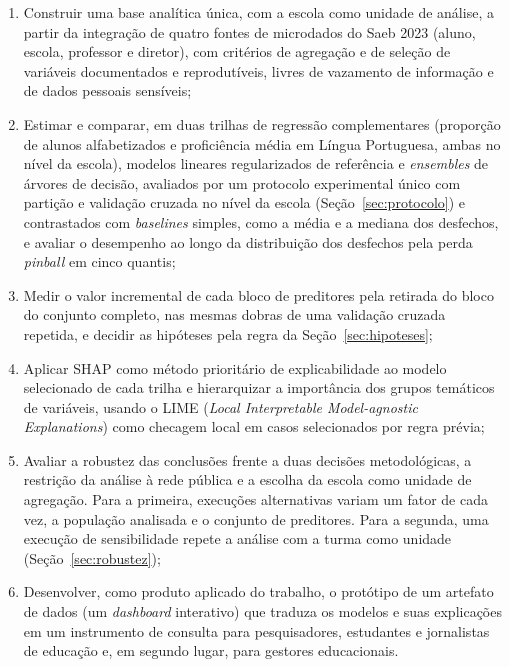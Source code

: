 \begin{enumerate}
    \item Construir uma base analítica única, com a escola como unidade de
    análise, a partir da integração de quatro fontes de microdados do Saeb
    2023 (aluno, escola, professor e diretor), com critérios de agregação e
    de seleção de variáveis documentados e reprodutíveis, livres de
    vazamento de informação e de dados pessoais sensíveis;
    \item Estimar e comparar, em duas trilhas de regressão complementares
    (proporção de alunos alfabetizados e proficiência média em Língua
    Portuguesa, ambas no nível da escola), modelos lineares regularizados
    de referência e \textit{ensembles} de árvores de decisão, avaliados por
    um protocolo experimental único com partição e validação cruzada no
    nível da escola (Seção~\ref{sec:protocolo}) e contrastados com
    \textit{baselines} simples, como a média e a mediana dos desfechos, e
    avaliar o desempenho ao longo da distribuição dos desfechos pela perda
    \textit{pinball} em cinco quantis;
    \item Medir o valor incremental de cada bloco de preditores pela
    retirada do bloco do conjunto completo, nas mesmas dobras de uma
    validação cruzada repetida, e decidir as hipóteses pela regra da
    Seção~\ref{sec:hipoteses};
    \item Aplicar SHAP como método prioritário de explicabilidade ao modelo
    selecionado de cada trilha e hierarquizar a importância dos grupos
    temáticos de variáveis, usando o LIME (\textit{Local Interpretable
    Model-agnostic Explanations}) como checagem local em casos
    selecionados por regra prévia;
    \item Avaliar a robustez das conclusões frente a duas decisões
    metodológicas, a restrição da análise à rede pública e a escolha da
    escola como unidade de agregação. Para a primeira, execuções
    alternativas variam um fator de cada vez, a população analisada e o
    conjunto de preditores. Para a segunda, uma execução de sensibilidade
    repete a análise com a turma como unidade (Seção~\ref{sec:robustez});
    \item Desenvolver, como produto aplicado do trabalho, o protótipo de um
    artefato de dados (um \emph{dashboard} interativo) que traduza os
    modelos e suas explicações em um instrumento de consulta para
    pesquisadores, estudantes e jornalistas de educação e, em segundo
    lugar, para gestores educacionais.
\end{enumerate}

